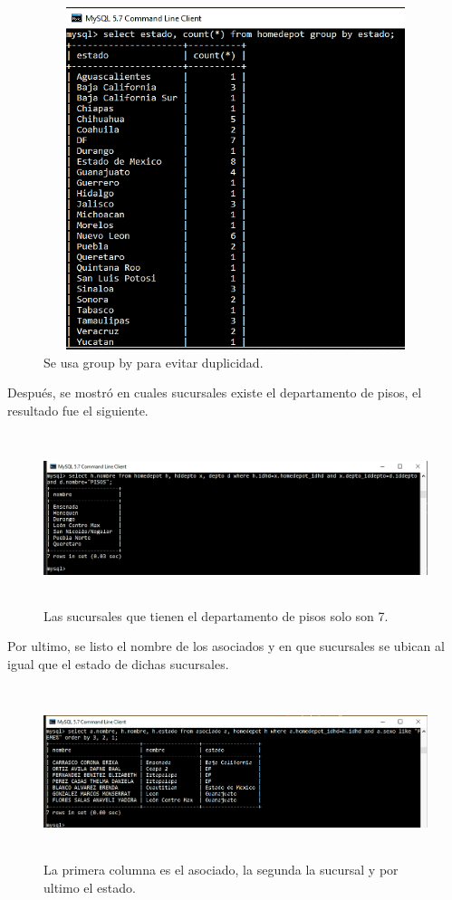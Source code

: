 \documentclass[12pt, titlepage]{article}
\begin{document}
 \begin{figure}[H]
	\begin{center}
		\includegraphics[width=14cm, height=10cm]{img/comando11.png}
		\caption{Se usa group by para evitar duplicidad.}
		\label{fig:comando11}
	\end{center}
\end{figure}
Después, se mostró en cuales sucursales existe el departamento de pisos, el resultado fue el siguiente.
 \begin{figure}[H]
	\begin{center}
		\includegraphics[width=15cm, height=5cm]{img/comando12.png}
		\caption{Las sucursales que tienen el departamento de pisos solo son 7.}
		\label{fig:comando12}
	\end{center}
\end{figure}
Por ultimo, se listo el nombre de los asociados y en que sucursales se ubican al igual que el estado de dichas sucursales.
 \begin{figure}[H]
	\begin{center}
		\includegraphics[width=15cm, height=5cm]{img/comando13.png}
		\caption{La primera columna es el asociado, la segunda la sucursal y por ultimo el estado.}
		\label{fig:comando13}
	\end{center}
\end{figure}
\end{document}
